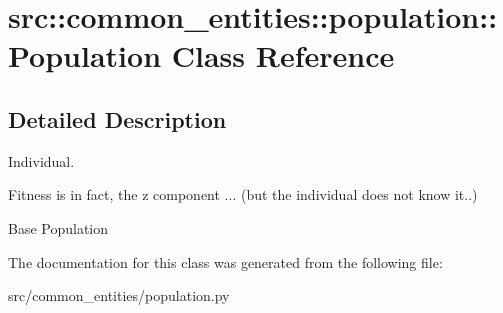\hypertarget{classsrc_1_1common__entities_1_1population_1_1Population}{
\section{src::common\_\-entities::population::Population Class Reference}
\label{classsrc_1_1common__entities_1_1population_1_1Population}
}


\subsection{Detailed Description}
\begin{DoxyVerb}
    Individual.
    \end{DoxyVerb}
 \begin{DoxyVerb}
    Fitness is in fact, the z component ... (but the individual does not know it..)
    \end{DoxyVerb}
 \begin{DoxyVerb}
Base Population
\end{DoxyVerb}
 

The documentation for this class was generated from the following file:\begin{DoxyCompactItemize}
\item 
src/common\_\-entities/population.py\end{DoxyCompactItemize}
